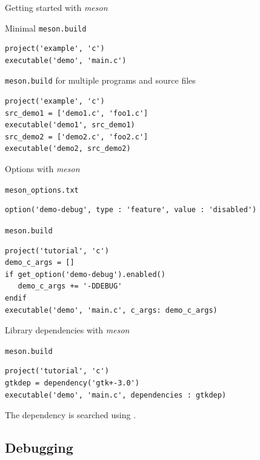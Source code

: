 \begin{frame}[fragile]{Getting started with {\em meson}}
  \begin{block}{Minimal {\tt meson.build}}
\begin{verbatim}
project('example', 'c')
executable('demo', 'main.c')
\end{verbatim}
  \end{block}

  \begin{block}{{\tt meson.build} for multiple programs and source files}
\begin{verbatim}
project('example', 'c')
src_demo1 = ['demo1.c', 'foo1.c']
executable('demo1', src_demo1)
src_demo2 = ['demo2.c', 'foo2.c']
executable('demo2, src_demo2)
\end{verbatim}
  \end{block}
\end{frame}

\begin{frame}[fragile]{Options with {\em meson}}
  \begin{block}{{\tt meson\_options.txt}}
\begin{verbatim}
option('demo-debug', type : 'feature', value : 'disabled')
\end{verbatim}
  \end{block}

  \begin{block}{{\tt meson.build}}
\begin{verbatim}
project('tutorial', 'c')
demo_c_args = []
if get_option('demo-debug').enabled()
   demo_c_args += '-DDEBUG'
endif
executable('demo', 'main.c', c_args: demo_c_args)
\end{verbatim}
  \end{block}
\end{frame}

\begin{frame}[fragile]{Library dependencies with {\em meson}}
  \begin{block}{{\tt meson.build}}
\begin{verbatim}
project('tutorial', 'c')
gtkdep = dependency('gtk+-3.0')
executable('demo', 'main.c', dependencies : gtkdep)
\end{verbatim}
  \end{block}

  The dependency  is searched using .
\end{frame}

\subsection{Debugging}

